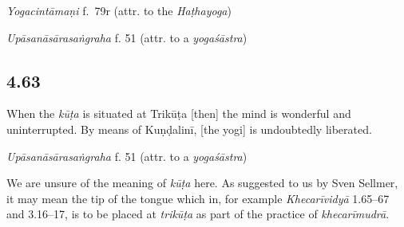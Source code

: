 \begin{ekdosis}

\begin{testimonia}[hp04_062]
\emph{Yogacintāmaṇi} f.~79r (attr. to the \emph{Haṭhayoga})
\begin{versinnote}
\end{versinnote}

\emph{Upāsanāsārasaṅgraha} f. 51 (attr. to a \emph{yogaśāstra})
\begin{versinnote}
\end{versinnote}
\end{testimonia}


\subsection*{4.63}
\begin{translation}[hp04_061]
When the \emph{kūṭa} is situated at Trikūṭa [then] the mind is wonderful and uninterrupted. By means of Kuṇḍalinī, [the yogi] is undoubtedly liberated.
\end{translation}


\begin{testimonia}[hp04_061]
\emph{Upāsanāsārasaṅgraha} f. 51 (attr. to a \emph{yogaśāstra})
\begin{versinnote}
\end{versinnote}
\end{testimonia}

\begin{philcomm}[hp04_061]
We are unsure of the meaning of \emph{kūṭa} here. As suggested to us by Sven Sellmer, it may mean the tip of the tongue which in, for example \emph{Khecarīvidyā} 1.65–67 and 3.16–17, is to be placed at \emph{trikūṭa} as part of the practice of \emph{khecarīmudrā}.
\end{philcomm}


\end{ekdosis}
